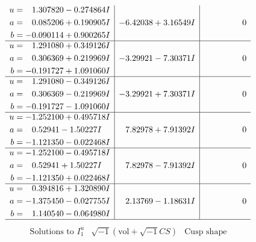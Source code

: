 \documentclass[1p]{elsarticle_modified}
\theoremstyle{definition}
\newcommand{\I}{\sqrt{-1}}
\begin{document}
$$\begin{array}{c|c|c}
\begin{aligned}
u &= \phantom{-}1.307820 - 0.274864 I \\
a &= \phantom{-}0.085206 + 0.190905 I \\
b &= -0.090114 + 0.900265 I\end{aligned}
 & -6.42038 + 3.16549 I & \phantom{-0.000000 } 0 \\ \hline\begin{aligned}
u &= \phantom{-}1.291080 + 0.349126 I \\
a &= \phantom{-}0.306369 + 0.219969 I \\
b &= -0.191727 + 1.091060 I\end{aligned}
 & -3.29921 - 7.30371 I & \phantom{-0.000000 } 0 \\ \hline\begin{aligned}
u &= \phantom{-}1.291080 - 0.349126 I \\
a &= \phantom{-}0.306369 - 0.219969 I \\
b &= -0.191727 - 1.091060 I\end{aligned}
 & -3.29921 + 7.30371 I & \phantom{-0.000000 } 0 \\ \hline\begin{aligned}
u &= -1.252100 + 0.495718 I \\
a &= \phantom{-}0.52941 - 1.50227 I \\
b &= -1.121350 - 0.022468 I\end{aligned}
 & \phantom{-}7.82978 + 7.91392 I & \phantom{-0.000000 } 0 \\ \hline\begin{aligned}
u &= -1.252100 - 0.495718 I \\
a &= \phantom{-}0.52941 + 1.50227 I \\
b &= -1.121350 + 0.022468 I\end{aligned}
 & \phantom{-}7.82978 - 7.91392 I & \phantom{-0.000000 } 0 \\ \hline\begin{aligned}
u &= \phantom{-}0.394816 + 1.320890 I \\
a &= -1.375450 - 0.027755 I \\
b &= \phantom{-}1.140540 - 0.064980 I\end{aligned}
 & \phantom{-}2.13769 - 1.18631 I & \phantom{-0.000000 } 0\\
 \hline 
 \end{array}$$\newpage$$\begin{array}{c|c|c}  
\text{Solutions to }I^u_{1}& \I (\text{vol} + \sqrt{-1}CS) & \text{Cusp shape}\\
 \hline 
\begin{aligned}

\end{aligned}
\end{array}$$
\end{document}
